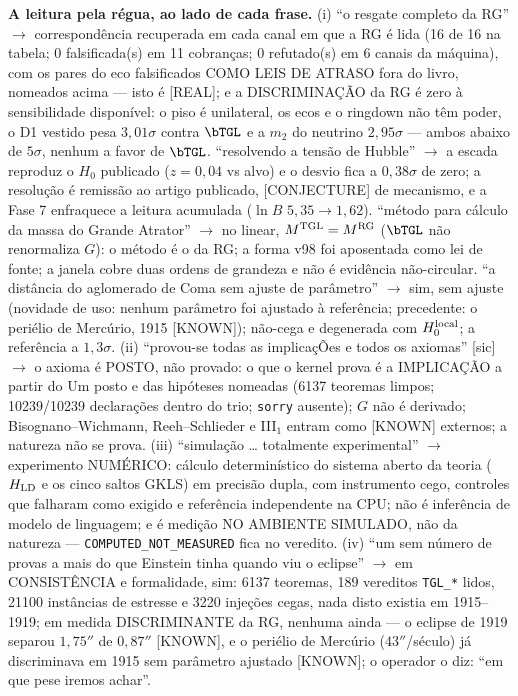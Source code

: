 \textbf{A leitura pela régua, ao lado de cada frase.} (i) ``o resgate completo da RG'' $\to$ correspondência recuperada em cada canal em que a RG é lida (16 de 16 na tabela; 0 falsificada(s) em 11 cobranças; 0 refutado(s) em 6 canais da máquina), com os pares do eco falsificados COMO LEIS DE ATRASO fora do livro, nomeados acima --- isto é \textsf{[REAL]}; e a DISCRIMINAÇÃO da RG é zero à sensibilidade disponível: o piso é unilateral, os ecos e o ringdown não têm poder, o D1 vestido pesa $3{,}01\sigma$ contra $\bTGL$ e a $m_2$ do neutrino $2{,}95\sigma$ --- ambos abaixo de $5\sigma$, nenhum a favor de $\bTGL$. ``resolvendo a tensão de Hubble'' $\to$ a escada reproduz o $H_0$ publicado ($z=0{,}04$ vs alvo) e o desvio fica a $0{,}38\sigma$ de zero; a resolução é remissão ao artigo publicado, \textsf{[CONJECTURE]} de mecanismo, e a Fase 7 enfraquece a leitura acumulada ($\ln B$ $5{,}35\to1{,}62$). ``método para cálculo da massa do Grande Atrator'' $\to$ no linear, $M^{\rm TGL}=M^{\rm RG}$ ($\bTGL$ não renormaliza $G$): o método é o da RG; a forma v98 foi aposentada como lei de fonte; a janela cobre duas ordens de grandeza e não é evidência não-circular. ``a distância do aglomerado de Coma sem ajuste de parâmetro'' $\to$ sim, sem ajuste (novidade de uso: nenhum parâmetro foi ajustado à referência; precedente: o periélio de Mercúrio, 1915 \textsf{[KNOWN]}); não-cega e degenerada com $H_0^{\rm local}$; a referência a $1{,}3\sigma$. (ii) ``provou-se todas as implicaçÕes e todos os axiomas'' [sic] $\to$ o axioma é POSTO, não provado: o que o kernel prova é a IMPLICAÇÃO a partir do Um posto e das hipóteses nomeadas (6137 teoremas limpos; 10239/10239 declarações dentro do trio; \texttt{sorry} ausente); $G$ não é derivado; Bisognano--Wichmann, Reeh--Schlieder e III$_1$ entram como \textsf{[KNOWN]} externos; a natureza não se prova. (iii) ``simulação … totalmente experimental'' $\to$ experimento NUMÉRICO: cálculo determinístico do sistema aberto da teoria ($H_{\rm LD}$ e os cinco saltos GKLS) em precisão dupla, com instrumento cego, controles que falharam como exigido e referência independente na CPU; não é inferência de modelo de linguagem; e é medição NO AMBIENTE SIMULADO, não da natureza --- \texttt{COMPUTED\_NOT\_MEASURED} fica no veredito. (iv) ``um sem número de provas a mais do que Einstein tinha quando viu o eclipse'' $\to$ em CONSISTÊNCIA e formalidade, sim: 6137 teoremas, 189 vereditos \texttt{TGL\_*} lidos, 21100 instâncias de estresse e 3220 injeções cegas, nada disto existia em 1915--1919; em medida DISCRIMINANTE da RG, nenhuma ainda --- o eclipse de 1919 separou $1{,}75''$ de $0{,}87''$ \textsf{[KNOWN]}, e o periélio de Mercúrio ($43''$/século) já discriminava em 1915 sem parâmetro ajustado \textsf{[KNOWN]}; o operador o diz: ``em que pese iremos achar''.

